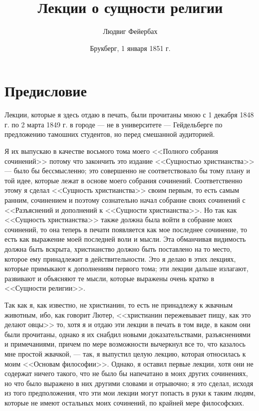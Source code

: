 \documentclass[12pt]{article}
\title{Лекции о сущности религии}
\author{Людвиг Фейербах}
\date{Брукберг, 1 января 1851 г.}
\begin{document}
\maketitle

\tableofcontents

\section*{Предисловие}

Лекции, которые я здесь отдаю в печать, были прочитаны мною с 1 декабря 1848 г. по 2 марта 1849 г. в городе --- не в университете --- Гейдельберге по предложению тамошних студентов, но перед смешанной аудиторией. 

Я их выпускаю в качестве восьмого тома моего <<Полного собрания сочинений>>  потому что закончить это издание <<Сущностью христианства>> --- было бы бессмысленно; это совершенно не соответствовало бы тому плану и той идее, которые лежат в основе моего собрания сочинений. Соответственно этому я сделал <<Сущность христианства>> своим первым, то есть самым ранним, сочинением и поэтому сознательно начал собрание своих сочинений с <<Разъяснений и дополнений к <<Сущности христианства>>. Но так как <<Сущность христианства>> также должна была войти в собрание моих сочинений, то она теперь в печати появляется как мое последнее сочинение, то есть как выражение моей последней воли и мысли. Эта обманчивая видимость должна быть вскрыта, христианство должно быть поставлено на то место, которое ему принадлежит в действительности. Это я делаю в этих лекциях, которые примыкают к дополнениям первого тома; эти лекции дальше излагают, развивают и объясняют те мысли, которые выражены очень кратко в <<Сущности религии>>. 

Так как я, как известно, не христианин, то есть не принадлежу к жвачным животным, ибо, как говорит Лютер, <<христианин пережевывает пищу, как это делают овцы>>  то, хотя я и отдаю эти лекции в печать в том виде, в каком они были прочитаны, однако я их снабдил новыми доказательствами, разъяснениями и примечаниями, причем по мере возможности вычеркнул все то, что казалось мне простой жвачкой, --- так, я выпустил целую лекцию, которая относилась к моим <<Основам философии>>. Однако, я оставил первые лекции, хотя они не содержат ничего такого, что не было бы напечатано в моих других сочинениях, но что было выражено в них другими словами и отрывочно; я это сделал, исходя из того предположения, что эти мои лекции могут попасть в руки к таким людям, которые не имеют остальных моих сочинений, по крайней мере философских. 
\end{document}
